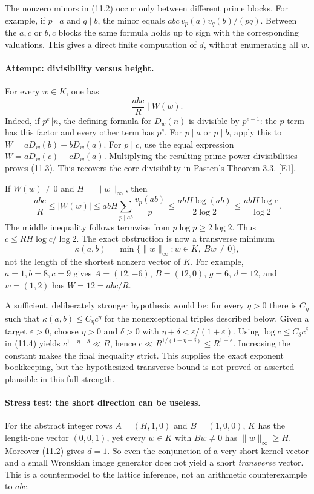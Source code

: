 \documentclass[11pt,a4paper]{article}
\newcommand{\eref}[2]{\hyperlink{extra:#1:#2}{[E#2]}}
\begin{document}
The nonzero minors in (11.2) occur only between different prime blocks.
For example, if $p\mid a$ and $q\mid b$, the minor equals
$abc\,v_p(a)v_q(b)/(pq)$. Between the $a,c$ or $b,c$ blocks the same
formula holds up to sign with the corresponding valuations. This gives
a direct finite computation of $d$, without enumerating all $w$.

\paragraph{Attempt: divisibility versus height.}
For every $w\in K$, one has
\[
 \frac{abc}{R}\mid W(w). \tag{11.3}
\]
Indeed, if $p^e\Vert n$, the defining formula for $D_w(n)$ is divisible
by $p^{e-1}$: the $p$-term has this factor and every other term has
$p^e$. For $p\mid a$ or $p\mid b$, apply this to
$W=aD_w(b)-bD_w(a)$. For $p\mid c$, use the equal expression
$W=aD_w(c)-cD_w(a)$. Multiplying the resulting prime-power divisibilities
proves (11.3). This recovers the core divisibility in Pasten's
Theorem 3.3. \eref{13}{1}.

If $W(w)\ne0$ and $H=\|w\|_\infty$, then
\[
 \frac{abc}{R}\leq |W(w)|
 \leq abH\sum_{p\mid ab}\frac{v_p(ab)}p
 \leq \frac{abH\log(ab)}{2\log2}
 \leq \frac{abH\log c}{\log2}. \tag{11.4}
\]
The middle inequality follows termwise from $p\log p\geq2\log2$.
Thus $c\leq RH\log c/\log2$. The exact obstruction is now a transverse
minimum
\[
 \kappa(a,b)=\min\{\|w\|_\infty:w\in K,\ Bw\ne0\}, \tag{11.5}
\]
not the length of the shortest nonzero vector of $K$.
For example, $a=1,b=8,c=9$ gives $A=(12,-6)$, $B=(12,0)$,
$g=6$, $d=12$, and $w=(1,2)$ has $W=12=abc/R$.

A sufficient, deliberately stronger hypothesis would be: for every
$\eta>0$ there is $C_\eta$ such that
$\kappa(a,b)\leq C_\eta c^\eta$ for the nonexceptional triples described
below. Given a target $\varepsilon>0$, choose
$\eta>0$ and $\delta>0$ with $\eta+\delta<\varepsilon/(1+\varepsilon)$.
Using $\log c\leq C_\delta c^\delta$ in (11.4) yields
$c^{1-\eta-\delta}\ll R$, hence
$c\ll R^{1/(1-\eta-\delta)}\leq R^{1+\varepsilon}$.
Increasing the constant makes the final inequality strict. This supplies
the exact exponent bookkeeping, but the hypothesized transverse bound
is not proved or asserted plausible in this full strength.

\paragraph{Stress test: the short direction can be useless.}
For the abstract integer rows $A=(H,1,0)$ and $B=(1,0,0)$,
$K$ has the length-one vector $(0,0,1)$, yet every $w\in K$ with
$Bw\ne0$ has $\|w\|_\infty\geq H$. Moreover (11.2) gives $d=1$.
So even the conjunction of a very short kernel vector and a small
Wronskian image generator does not yield a short \emph{transverse}
vector. This is a countermodel to the lattice inference, not an
arithmetic counterexample to $abc$.
\end{document}

